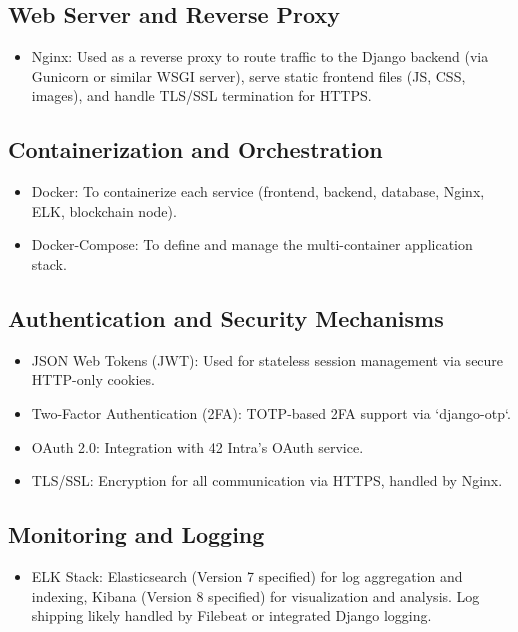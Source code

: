 \subsection*{Web Server and Reverse Proxy}
\begin{itemize}
    \item Nginx: Used as a reverse proxy to route traffic to the Django backend (via Gunicorn or similar WSGI server), serve static frontend files (JS, CSS, images), and handle TLS/SSL termination for HTTPS.
\end{itemize}

\subsection*{Containerization and Orchestration}
\begin{itemize}
    \item Docker: To containerize each service (frontend, backend, database, Nginx, ELK, blockchain node).
    \item Docker-Compose: To define and manage the multi-container application stack.
\end{itemize}

\subsection*{Authentication and Security Mechanisms}
\begin{itemize}
    \item JSON Web Tokens (JWT): Used for stateless session management via secure HTTP-only cookies.
    \item Two-Factor Authentication (2FA): TOTP-based 2FA support via `django-otp`.
    \item OAuth 2.0: Integration with 42 Intra's OAuth service.
    \item TLS/SSL: Encryption for all communication via HTTPS, handled by Nginx.
\end{itemize}

\subsection*{Monitoring and Logging}
\begin{itemize}
    \item ELK Stack: Elasticsearch (Version 7 specified) for log aggregation and indexing, Kibana (Version 8 specified) for visualization and analysis. Log shipping likely handled by Filebeat or integrated Django logging.
\end{itemize}

